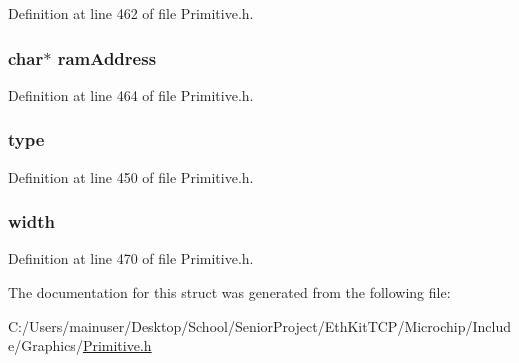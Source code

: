 Definition at line 462 of file Primitive.\+h.

\hypertarget{struct_g_f_x___i_m_a_g_e___h_e_a_d_e_r_a349bf1673b26cefda4930d1cbea36829}{}
\subsubsection[{ram\+Address}]{\setlength{\rightskip}{0pt plus 5cm}char$\ast$ ram\+Address}\label{struct_g_f_x___i_m_a_g_e___h_e_a_d_e_r_a349bf1673b26cefda4930d1cbea36829}


Definition at line 464 of file Primitive.\+h.

\hypertarget{struct_g_f_x___i_m_a_g_e___h_e_a_d_e_r_ad19c8e0d19c638be9dd81d163454b0f1}{}
\subsubsection[{type}]{ type}\label{struct_g_f_x___i_m_a_g_e___h_e_a_d_e_r_ad19c8e0d19c638be9dd81d163454b0f1}


Definition at line 450 of file Primitive.\+h.

\hypertarget{struct_g_f_x___i_m_a_g_e___h_e_a_d_e_r_a1fd31a71d8ffffeeacaa6eef4782ee24}{}
\subsubsection[{width}]{ width}\label{struct_g_f_x___i_m_a_g_e___h_e_a_d_e_r_a1fd31a71d8ffffeeacaa6eef4782ee24}


Definition at line 470 of file Primitive.\+h.



The documentation for this struct was generated from the following file\+:\begin{DoxyCompactItemize}
\item 
C\+:/\+Users/mainuser/\+Desktop/\+School/\+Senior\+Project/\+Eth\+Kit\+T\+C\+P/\+Microchip/\+Include/\+Graphics/\hyperlink{_primitive_8h}{Primitive.\+h}\end{DoxyCompactItemize}
